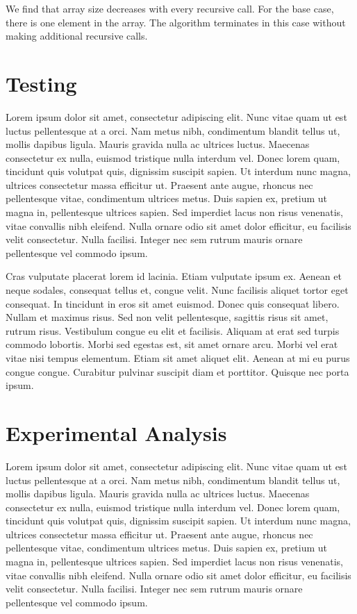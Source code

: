 \documentclass[11pt]{scrreprt}
\begin{document}
We find that array size decreases with every recursive call. For the base case, there is one element in the array. The algorithm terminates in this case without making additional recursive calls.


\chapter{Testing}

Lorem ipsum dolor sit amet, consectetur adipiscing elit. Nunc vitae quam ut est luctus pellentesque at a orci. Nam metus nibh, condimentum blandit tellus ut, mollis dapibus ligula. Mauris gravida nulla ac ultrices luctus. Maecenas consectetur ex nulla, euismod tristique nulla interdum vel. Donec lorem quam, tincidunt quis volutpat quis, dignissim suscipit sapien. Ut interdum nunc magna, ultrices consectetur massa efficitur ut. Praesent ante augue, rhoncus nec pellentesque vitae, condimentum ultrices metus. Duis sapien ex, pretium ut magna in, pellentesque ultrices sapien. Sed imperdiet lacus non risus venenatis, vitae convallis nibh eleifend. Nulla ornare odio sit amet dolor efficitur, eu facilisis velit consectetur. Nulla facilisi. Integer nec sem rutrum mauris ornare pellentesque vel commodo ipsum.

Cras vulputate placerat lorem id lacinia. Etiam vulputate ipsum ex. Aenean et neque sodales, consequat tellus et, congue velit. Nunc facilisis aliquet tortor eget consequat. In tincidunt in eros sit amet euismod. Donec quis consequat libero. Nullam et maximus risus. Sed non velit pellentesque, sagittis risus sit amet, rutrum risus. Vestibulum congue eu elit et facilisis. Aliquam at erat sed turpis commodo lobortis. Morbi sed egestas est, sit amet ornare arcu. Morbi vel erat vitae nisi tempus elementum. Etiam sit amet aliquet elit. Aenean at mi eu purus congue congue. Curabitur pulvinar suscipit diam et porttitor. Quisque nec porta ipsum. 


\chapter{Experimental Analysis}

Lorem ipsum dolor sit amet, consectetur adipiscing elit. Nunc vitae quam ut est luctus pellentesque at a orci. Nam metus nibh, condimentum blandit tellus ut, mollis dapibus ligula. Mauris gravida nulla ac ultrices luctus. Maecenas consectetur ex nulla, euismod tristique nulla interdum vel. Donec lorem quam, tincidunt quis volutpat quis, dignissim suscipit sapien. Ut interdum nunc magna, ultrices consectetur massa efficitur ut. Praesent ante augue, rhoncus nec pellentesque vitae, condimentum ultrices metus. Duis sapien ex, pretium ut magna in, pellentesque ultrices sapien. Sed imperdiet lacus non risus venenatis, vitae convallis nibh eleifend. Nulla ornare odio sit amet dolor efficitur, eu facilisis velit consectetur. Nulla facilisi. Integer nec sem rutrum mauris ornare pellentesque vel commodo ipsum.
\end{document}

